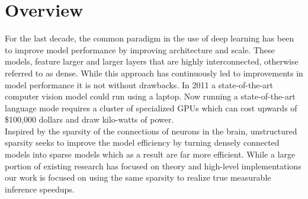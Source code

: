 \section{Overview}
For the last decade, the common paradigm in the use of deep learning has been to improve model performance by improving architecture and scale. These models, feature larger and larger layers that are highly interconnected, otherwise referred to as dense. While this approach has continuously led to improvements in model performance it is not without drawbacks. In 2011 a state-of-the-art computer vision model could run using a laptop. Now running a state-of-the-art language mode requires a cluster of specialized GPUs which can cost upwards of \$100,000 dollars and draw kilo-watts of power. \\
Inspired by the sparsity of the connections of neurons in the brain, unstructured sparsity seeks to improve the model efficiency by turning densely connected models into sparse models which as a result are far more efficient. While a large portion of existing research has focused on theory and high-level implementations our work is focused on using the same sparsity to realize true measurable inference speedups. 
